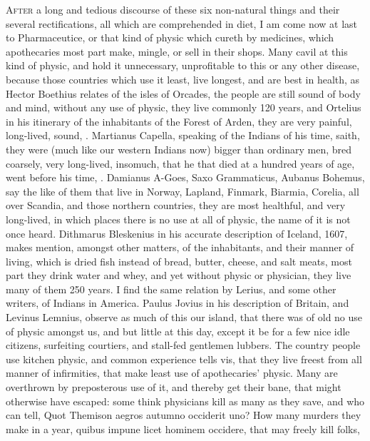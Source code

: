 {\lettrine{A}{fter} a long and tedious discourse of these six non-natural things and
their several rectifications, all which are comprehended in diet, I am
come now at last to Pharmaceutice, or that kind of physic which cureth
by medicines, which apothecaries most part make, mingle, or sell in
their shops. Many cavil at this kind of physic, and hold it
unnecessary, unprofitable to this or any other disease, because those
countries which use it least, live longest, and are best in health, as
Hector Boethius relates of the isles of Orcades, the people are
still sound of body and mind, without any use of physic, they live
commonly 120 years, and Ortelius in his itinerary of the inhabitants of
the Forest of Arden,  they are very painful, long-lived, sound,
\etc{}. Martianus Capella, speaking of the Indians of his time,
saith, they were (much like our western Indians now) bigger than
ordinary men, bred coarsely, very long-lived, insomuch, that he that
died at a hundred years of age, went before his time, \etc{}. Damianus
A-Goes, Saxo Grammaticus, Aubanus Bohemus, say the like of them that
live in Norway, Lapland, Finmark, Biarmia, Corelia, all over Scandia,
and those northern countries, they are most healthful, and very
long-lived, in which places there is no use at all of physic, the name
of it is not once heard. Dithmarus Bleskenius in his accurate
description of Iceland, 1607, makes mention, amongst other matters, of
the inhabitants, and their manner of living, which is dried fish
instead of bread, butter, cheese, and salt meats, most part they drink
water and whey, and yet without physic or physician, they live many of
them 250 years. I find the same relation by Lerius, and some other
writers, of Indians in America. Paulus Jovius in his description of
Britain, and Levinus Lemnius, observe as much of this our island, that
there was of old no use of physic amongst us, and but little at
this day, except it be for a few nice idle citizens, surfeiting
courtiers, and stall-fed gentlemen lubbers. The country people use
kitchen physic, and common experience tells vis, that they live freest
from all manner of infirmities, that make least use of apothecaries'
physic. Many are overthrown by preposterous use of it, and thereby get
their bane, that might otherwise have escaped: some think
physicians kill as many as they save, and who can tell, Quot
Themison aegros autumno occiderit uno? How many murders they make in a
year, quibus impune licet hominem occidere, that may freely kill folks,
}
